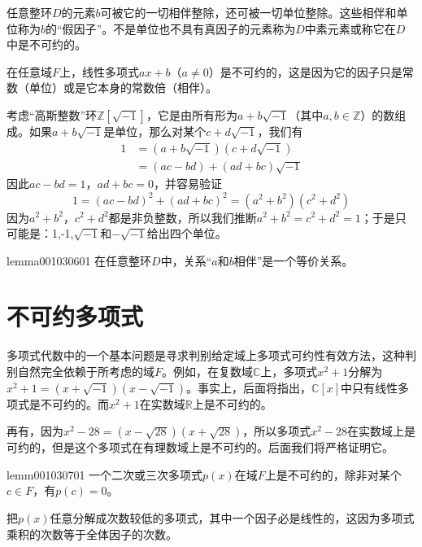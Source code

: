 任意整环$D$的元素$b$可被它的一切相伴整除，还可被一切单位整除。这些相伴和单位称为$b$的“假因子”。不是单位也不具有真因子的元素称为$D$中素元素或称它在$D$中是不可约的。

\begin{example}\label{exam001030605}
在任意域$F$上，线性多项式$ax+b$（$a \neq 0$）是不可约的，这是因为它的因子只是常数（单位）或是它本身的常数倍（相伴）。
\end{example}

\begin{example}\label{exam001030606}
考虑“高斯整数”环$\mathbb{Z}[\sqrt{-1}]$，它是由所有形为$a + b\sqrt{-1}$（其中$a, b \in \mathbb{Z}$）的数组成。如果$a + b\sqrt{-1}$是单位，那么对某个$c + d\sqrt{-1}$，我们有
\[
\begin{aligned}
1 &= (a + b\sqrt{-1})(c+d\sqrt{-1}) \\
&=(ac - bd) + (ad + bc)\sqrt{-1}
\end{aligned}
\]
因此$ac-bd = 1$，$ad+bc = 0$，并容易验证
\[
1 = (ac-bd)^2 + (ad+bc)^2 = (a^2+b^2)(c^2+d^2)
\]
因为$a^2+b^2$，$c^2+d^2$都是非负整数，所以我们推断$a^2+b^2=c^2+d^2=1$；于是只可能是：1,-1,$\sqrt{-1}$和$-\sqrt{-1}$给出四个单位。
\end{example}

\begin{lemma}{}{lemma001030601}
在任意整环$D$中，关系“$a$和$b$相伴”是一个等价关系。
\end{lemma}


\section{不可约多项式}\label{subsection0010307}
多项式代数中的一个基本问题是寻求判别给定域上多项式可约性有效方法，这种判别自然完全依赖于所考虑的域$F$。例如，在复数域$\mathbb{C}$上，多项式$x^2+1$分解为$x^2+1=(x+\sqrt{-1})(x-\sqrt{-1})$。事实上，后面将指出，$\mathbb{C}[x]$中只有线性多项式是不可约的。而$x^2+1$在实数域$\mathbb{R}$上是不可约的。

再有，因为$x^2-28=(x-\sqrt{28})(x+\sqrt{28})$，所以多项式$x^2-28$在实数域上是可约的，但是这个多项式在有理数域上是不可约的。后面我们将严格证明它。

\begin{lemma}{}{lemm001030701}
一个二次或三次多项式$p(x)$在域$F$上是不可约的，除非对某个$c \in F$，有$p(c)=0$。
\end{lemma}

把$p(x)$任意分解成次数较低的多项式，其中一个因子必是线性的，这因为多项式乘积的次数等于全体因子的次数。

